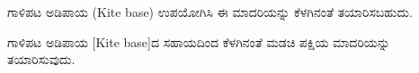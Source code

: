 ಗಾಳಿಪಟ ಅಡಿಪಾಯ (Kite base) ಉಪಯೋಗಿಸಿ ಈ ಮಾದರಿಯನ್ನು ಕೆಳಗಿನಂತೆ ತಯಾರಿಸಬಹುದು.
\begin{figure}[H]
\end{figure}
\begin{figure}[H]
\end{figure}

ಗಾಳಿಪಟ ಅಡಿಪಾಯ [Kite base]ದ ಸಹಾಯದಿಂದ ಕೆಳಗಿನಂತೆ ಮಡಚಿ ಪಕ್ಷಿಯ ಮಾದರಿ\-ಯನ್ನು ತಯಾರಿಸುವುದು. 
\begin{figure}[H]
\end{figure}
\begin{figure}[H]
\end{figure}


